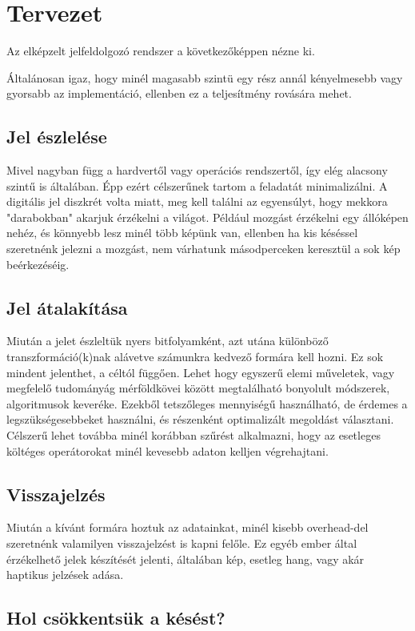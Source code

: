 
\section{Tervezet}

Az elk\'epzelt jelfeldolgoz\'o rendszer a k\"ovetkez\H ok\'eppen n\'ezne ki. 

\'Altal\'anosan igaz, hogy min\'el magasabb szint\"u egy r\'esz ann\'al k\'enyelmesebb vagy gyorsabb az implement\'aci\'o, ellenben ez a teljes\'itm\'eny rov\'as\'ara mehet. 

\subsection{Jel \'eszlel\'ese} 
Mivel nagyban f\"ugg a hardvert\H ol vagy oper\'aci\'os rendszert\H ol, \'igy el\'eg alacsony szint\H u is \'altal\'aban. 
\'Epp ez\'ert c\'elszer\H unek tartom a feladat\'at minimaliz\'alni.
A digit\'alis jel diszkr\'et volta miatt, meg kell tal\'alni az egyens\'ulyt, hogy mekkora "darabokban" akarjuk \'erz\'ekelni a vil\'agot. P\'eld\'aul mozg\'ast \'erz\'ekelni egy \'all\'ok\'epen neh\'ez, \'es k\"onnyebb lesz min\'el t\"obb k\'ep\"unk van, ellenben ha kis k\'es\'essel szeretn\'enk jelezni a mozg\'ast, nem v\'arhatunk m\'asodperceken kereszt\"ul a sok k\'ep be\'erkez\'es\'eig.

\subsection{Jel \'atalak\'it\'asa}
Miut\'an a jelet \'eszlelt\"uk nyers bitfolyamk\'ent, azt ut\'ana k\"ul\"onb\"oz\H o transzform\'aci\'o(k)nak al\'avetve sz\'amunkra kedvez\H o form\'ara kell hozni. Ez sok mindent jelenthet, a c\'elt\'ol f\"ugg\H oen. Lehet hogy egyszer\H u elemi m\H uveletek, vagy  megfelel\H o tudom\'any\'ag m\'erf\"oldk\"ovei k\"oz\"ott megtal\'alhat\'o bonyolult m\'odszerek, algoritmusok kever\'eke.
Ezekb\H ol tetsz\H oleges mennyis\'eg\H u haszn\'alhat\'o, de \'erdemes a legsz\"uks\'egesebbeket haszn\'alni, \'es r\'eszenk\'ent optimaliz\'alt megold\'ast v\'alasztani. 
C\'elszer\H u lehet tov\'abba min\'el kor\'abban sz\H ur\'est alkalmazni, hogy az esetleges k\"olt\'eges oper\'atorokat min\'el kevesebb adaton kelljen v\'egrehajtani.

\subsection{Visszajelz\'es}
Miut\'an a k\'iv\'ant form\'ara hoztuk az adatainkat, min\'el kisebb overhead-del szeretn\'enk valamilyen visszajelz\'est is kapni fel\H ole. 
Ez egy\'eb ember \'altal \'erz\'ekelhet\H o jelek k\'esz\'it\'es\'et jelenti, \'altal\'aban k\'ep, esetleg hang, vagy ak\'ar haptikus jelz\'esek ad\'asa.
 
\subsection{Hol cs\"okkents\"uk a k\'es\'est?}

